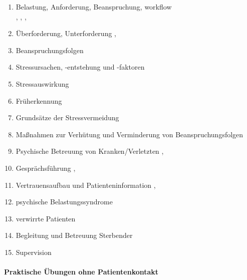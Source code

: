   \begin{enumerate}
    \item    Belastung, Anforderung, Beanspruchung, workflow
    \\
    ,
    ,
    ,
    \item    Überforderung, Unterforderung \dotfill  {},
    \item    Beanspruchungsfolgen \dotfill {}
    \item    Stressursachen, -entstehung und -faktoren \dotfill {}
    \item    Stressauswirkung \dotfill {}
    \item    Früherkennung \dotfill {}
    \item    Grundsätze der Stressvermeidung \dotfill {}
    \item    Maßnahmen zur Verhütung und Verminderung von Beanspruchungsfolgen \dotfill {}
    \item    Psychische Betreuung von Kranken/Verletzten \dotfill {},
    \item    Gesprächsführung \dotfill {},
    \item    Vertrauensaufbau und Patienteninformation \dotfill {},
    \item    psychische Belastungssyndrome \dotfill {}
    \item    verwirrte Patienten \dotfill {}
    \item    Begleitung und Betreuung Sterbender \dotfill {}
    \item    Supervision \dotfill {}
  \end{enumerate}

\paragraph{Praktische Übungen ohne Patientenkontakt}~
  
